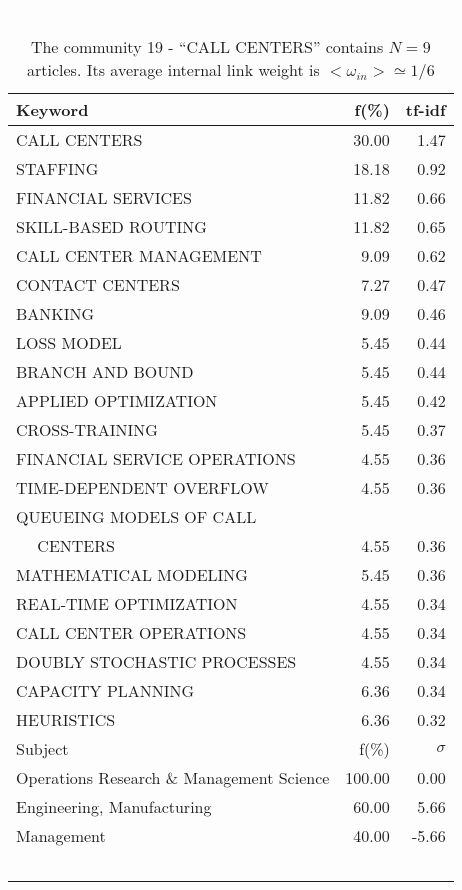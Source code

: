 \documentclass[a4paper,11pt]{report}
\begin{document}
\begin{landscape}
\clearpage

\begin{table}[!ht]
\caption{The community 19 - ``CALL CENTERS'' contains $N = 9$ articles. Its average internal link weight is $<\omega_{in}> \simeq 1/6$ }
\textcolor{white}{aa}\\
{\scriptsize\begin{tabular}{|l r  r|}
\hline
Keyword & f(\%) & tf-idf \\
\hline
CALL CENTERS & 30.00 & 1.47\\
STAFFING & 18.18 & 0.92\\
FINANCIAL SERVICES & 11.82 & 0.66\\
SKILL-BASED ROUTING & 11.82 & 0.65\\
CALL CENTER MANAGEMENT & 9.09 & 0.62\\
CONTACT CENTERS & 7.27 & 0.47\\
BANKING & 9.09 & 0.46\\
LOSS MODEL & 5.45 & 0.44\\
BRANCH AND BOUND & 5.45 & 0.44\\
APPLIED OPTIMIZATION & 5.45 & 0.42\\
CROSS-TRAINING & 5.45 & 0.37\\
FINANCIAL SERVICE OPERATIONS & 4.55 & 0.36\\
TIME-DEPENDENT OVERFLOW & 4.55 & 0.36\\
QUEUEING MODELS OF CALL &  &\\
$\quad$ CENTERS & 4.55 & 0.36\\
MATHEMATICAL MODELING & 5.45 & 0.36\\
REAL-TIME OPTIMIZATION & 4.55 & 0.34\\
CALL CENTER OPERATIONS & 4.55 & 0.34\\
DOUBLY STOCHASTIC PROCESSES & 4.55 & 0.34\\
CAPACITY PLANNING & 6.36 & 0.34\\
HEURISTICS & 6.36 & 0.32\\
\hline
\hline
Subject & f(\%) & $\sigma$\\
\hline
Operations Research \& Management Science & 100.00 & 0.00\\
Engineering, Manufacturing & 60.00 & 5.66\\
Management & 40.00 & -5.66\\
 &  & \\
 &  & \\
 &  & \\
 &  & \\
 &  & \\

\end{tabular}}
\end{table}
\end{landscape}
\end{document}
